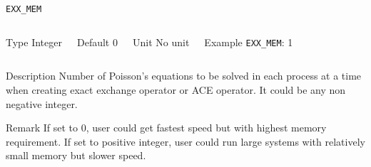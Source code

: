 \documentclass[xcolor=dvipsnames,t]{beamer}
\begin{document}
\begin{frame}[allowframebreaks]{\texttt{EXX\_MEM}} \label{EXX_MEM}
\vspace*{-12pt}
\begin{columns}
\begin{block}{Type}
Integer
\end{block}

\begin{block}{Default}
0
\end{block}

\begin{block}{Unit}
No unit
\end{block}

\begin{block}{Example}
\texttt{EXX\_MEM}: 1
\end{block}
\end{columns}

\begin{block}{Description}
Number of Poisson's equations to be solved in each process at a time when creating exact exchange operator or ACE operator. It could be any non negative integer. 
\end{block}

\begin{block}{Remark}
If set to 0, user could get fastest speed but with highest memory requirement. If set to positive integer, user could run large systems with relatively small memory but slower speed. 
\end{block}

\end{frame}
\end{document}
